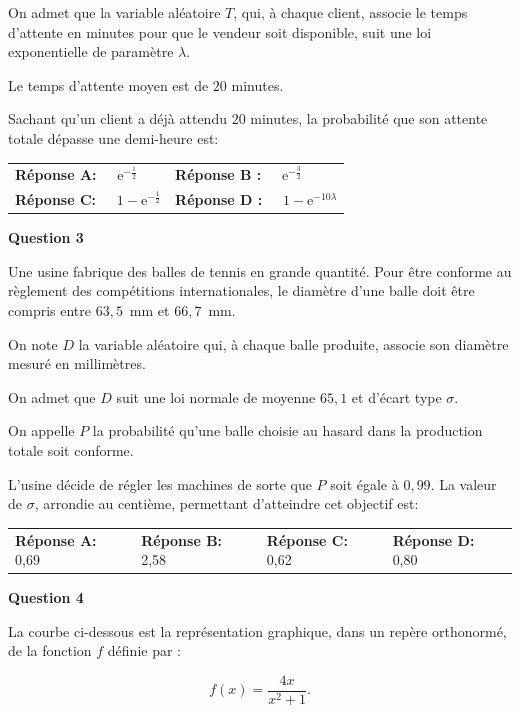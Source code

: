 \documentclass[10pt,a4paper]{article}
\begin{document}
On admet que la variable aléatoire $T$, qui, à chaque client, associe le temps d'attente en minutes pour que le vendeur soit disponible, suit une loi exponentielle de paramètre $\lambda$.

Le temps d'attente moyen est de $20$ minutes.

Sachant qu'un client a déjà attendu $20$ minutes, la probabilité que son attente totale dépasse une demi-heure est:

\medskip
\begin{tabularx}{\linewidth}{X X}
\textbf{Réponse A:~~} $\text{e}^{-\frac{1}{2}}$& \textbf{Réponse B :~~} $\text{e}^{-\frac{3}{2}}$\\
\textbf{Réponse C:~~} $1- \text{e}^{-\frac{1}{2}}$ &\textbf{Réponse D :~~} $1 - \text{e}^{-10\lambda}$
\end{tabularx}

\bigskip

\textbf{Question 3}

\medskip

Une usine fabrique des balles de tennis en grande quantité. Pour être conforme au règlement des compétitions internationales, le diamètre d'une balle doit être compris entre $63,5$~mm et $66,7$~mm.

On note $D$ la variable aléatoire qui, à chaque balle produite, associe son diamètre mesuré en millimètres.

On admet que $D$ suit une loi normale de moyenne $65,1$ et d'écart type $\sigma$.

On appelle $P$ la probabilité qu'une balle choisie au hasard dans la production totale soit conforme.

L'usine décide de régler les machines de sorte que $P$ soit égale à $0,99$. La valeur de $\sigma$, arrondie au centième,
permettant d'atteindre cet objectif est:

\medskip
\begin{tabularx}{\linewidth}{X X X X}
\textbf{Réponse A:~~} 0,69 &\textbf{Réponse B:~~} 2,58 &\textbf{Réponse C:~~} 0,62 &\textbf{Réponse D:~~} 0,80
\end{tabularx}

\bigskip

\textbf{Question 4}

\medskip

La courbe ci-dessous est la représentation graphique, dans un repère orthonormé, de la fonction $f$ définie par :

\[f(x) = \dfrac{4x}{x^2 + 1}.\]
\end{document}
